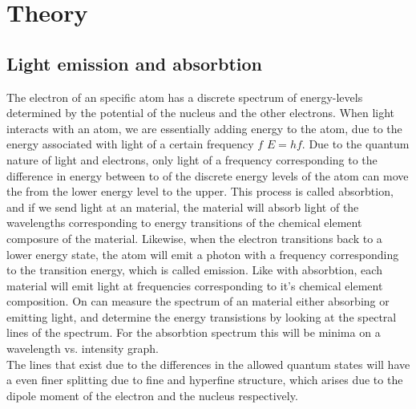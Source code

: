 \section{Theory}





\subsection{Light emission and absorbtion}

The electron of an specific atom has a discrete spectrum of energy-levels determined by the potential of the nucleus and the other electrons. When light interacts with an atom, we are essentially adding energy to the atom, due to the energy associated with light of a certain frequency $f$ $E=hf$. Due to the quantum nature of light and electrons, only light of a frequency corresponding to the difference in energy between to of the discrete energy levels of the atom can move the from the lower energy level to the upper. This process is called absorbtion, and if we send light at an material, the material will absorb light of the wavelengths corresponding to energy transitions of the chemical element composure of the material. Likewise, when the electron transitions back to a lower energy state, the atom will emit a photon with a frequency corresponding to the transition energy, which is called emission. Like with absorbtion, each material will emit light at frequencies corresponding to it's chemical element composition. On can measure the spectrum of an material either absorbing or emitting light, and determine the energy transistions by looking at the spectral lines of the spectrum. For the absorbtion spectrum this will be minima on a wavelength vs. intensity graph. \\

The lines that exist due to the differences in the allowed quantum states will have a even finer splitting due to fine and hyperfine structure, which arises due to the dipole moment of the electron and the nucleus respectively. 



